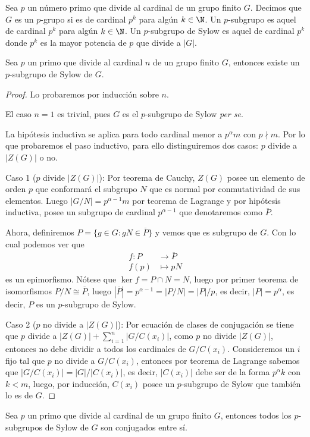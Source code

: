 \documentclass[11pt,oneside]{book}
\begin{document}
\begin{mydef}
Sea $p$ un número primo que divide al cardinal de un grupo finito $G$. Decimos que $G$ es un $p$-grupo si es de cardinal $p^k$ para algún $k\in\N$. Un $p$-subgrupo es aquel de cardinal $p^k$ para algún $k\in\N$. Un $p$-subgrupo de Sylow es aquel de cardinal $p^k$ donde $p^k$ es la mayor potencia de $p$ que divide a $|G|$.
\end{mydef}
\begin{thm}
Sea $p$ un primo que divide al cardinal $n$ de un grupo finito $G$, entonces existe un $p$-subgrupo de Sylow de $G$.
\end{thm}
\begin{proof}
Lo probaremos por inducción sobre $n$.

El caso $n=1$ es trivial, pues $G$ es el $p$-subgrupo de Sylow \textit{per se}.

La hipótesis inductiva se aplica para todo cardinal menor a $p^\alpha m$ con $p\nmid m$. Por lo que probaremos el paso inductivo, para ello distinguiremos dos casos: $p$ divide a $|Z(G)|$ o no.

Caso 1 ($p$ divide $|Z(G)|$): Por teorema de Cauchy, $Z(G)$ posee un elemento de orden $p$ que conformará el subgrupo $N$ que es normal por conmutatividad de sus elementos. Luego $|G/N|=p^{\alpha-1}m$ por teorema de Lagrange y por hipótesis inductiva, posee un subgrupo de cardinal $p^{\alpha-1}$ que denotaremos como $\overline{P}$.

Ahora, definiremos $P=\{g\in G:gN\in\overline{P}\}$ y vemos que es subgrupo de $G$. Con lo cual podemos ver que
\begin{align*}
f:P&\longrightarrow\overline{P}\\
f(p)&\longmapsto pN
\end{align*}
es un epimorfismo. Nótese que $\ker f=P\cap N=N$, luego por primer teorema de isomorfismos $P/N\cong\overline{P}$, luego $|\overline{P}|=p^{\alpha-1}=|P/N|=|P|/p$, es decir, $|P|=p^\alpha$, es decir, $P$ es un $p$-subgrupo de Sylow.

Caso 2 ($p$ no divide a $|Z(G)|$): Por ecuación de clases de conjugación se tiene que $p$ divide a $|Z(G)|+\sum_{i=1}^n|G/C(x_i)|$, como $p$ no divide $|Z(G)|$, entonces no debe dividir a todos los cardinales de $G/C(x_i)$. Consideremos un $i$ fijo tal que $p$ no divide a $G/C(x_i)$, entonces por teorema de Lagrange sabemos que $|G/C(x_i)|=|G|/|C(x_i)|$, es decir, $|C(x_i)|$ debe ser de la forma $p^\alpha k$ con $k\lt m$, luego, por inducción, $C(x_i)$ posee un $p$-subgrupo de Sylow que también lo es de $G$.
\end{proof}
\begin{thm}
Sea $p$ un primo que divide al cardinal de un grupo finito $G$, entonces todos los $p$-subgrupos de Sylow de $G$ son conjugados entre sí.
\end{thm}
\end{document}
